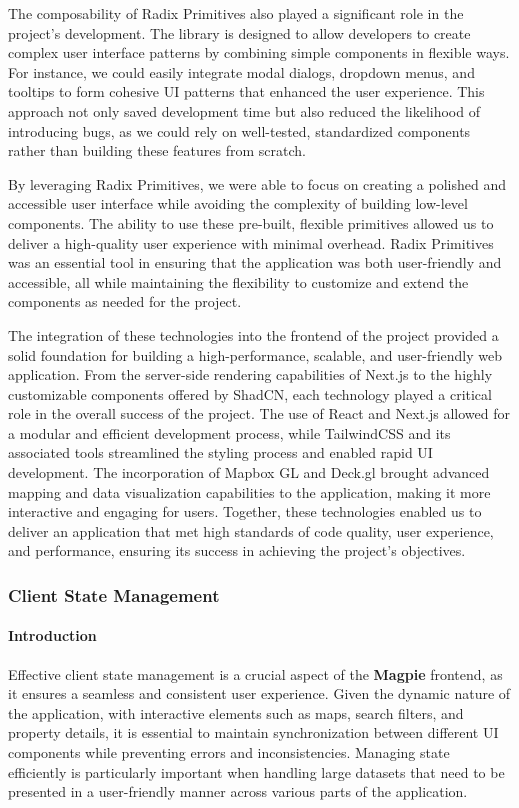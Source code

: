 \begin{enumerate}
    The composability of Radix Primitives also played a significant role in the project's development. The library is designed to allow developers to create complex user interface patterns by combining simple components in flexible ways. For instance, we could easily integrate modal dialogs, dropdown menus, and tooltips to form cohesive UI patterns that enhanced the user experience. This approach not only saved development time but also reduced the likelihood of introducing bugs, as we could rely on well-tested, standardized components rather than building these features from scratch.

    By leveraging Radix Primitives, we were able to focus on creating a polished and accessible user interface while avoiding the complexity of building low-level components. The ability to use these pre-built, flexible primitives allowed us to deliver a high-quality user experience with minimal overhead. Radix Primitives was an essential tool in ensuring that the application was both user-friendly and accessible, all while maintaining the flexibility to customize and extend the components as needed for the project.


\end{enumerate}

The integration of these technologies into the frontend of the project provided a solid foundation for building a high-performance, scalable, and user-friendly web application. From the server-side rendering capabilities of Next.js to the highly customizable components offered by ShadCN, each technology played a critical role in the overall success of the project. The use of React and Next.js allowed for a modular and efficient development process, while TailwindCSS and its associated tools streamlined the styling process and enabled rapid UI development. The incorporation of Mapbox GL and Deck.gl brought advanced mapping and data visualization capabilities to the application, making it more interactive and engaging for users. Together, these technologies enabled us to deliver an application that met high standards of code quality, user experience, and performance, ensuring its success in achieving the project’s objectives.

\subsubsection{Client State Management}
    \paragraph{Introduction}
    Effective client state management is a crucial aspect of the \textbf{Magpie} frontend, as it ensures a seamless and consistent user experience. Given the dynamic nature of the application, with interactive elements such as maps, search filters, and property details, it is essential to maintain synchronization between different UI components while preventing errors and inconsistencies. Managing state efficiently is particularly important when handling large datasets that need to be presented in a user-friendly manner across various parts of the application.
    \newline
